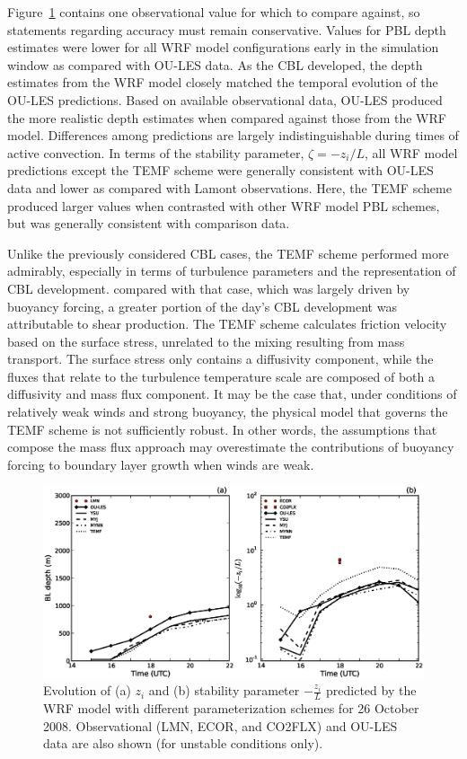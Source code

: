 Figure~\ref{figure425} contains one observational value for which to compare against, so statements regarding accuracy must remain conservative. Values for PBL depth estimates were lower for all WRF model configurations early in the simulation window as compared with OU-LES data. As the CBL developed, the depth estimates from the WRF model closely matched the temporal evolution of the OU-LES predictions. Based on available observational data, OU-LES produced the more realistic depth estimates when compared against those from the WRF model. Differences among predictions are largely indistinguishable during times of active convection. In terms of the stability parameter, $\zeta = -z_i / L$, all WRF model predictions except the TEMF scheme were generally consistent with OU-LES data and lower as compared with Lamont observations. Here, the TEMF scheme produced larger values when contrasted with other WRF model PBL schemes, but was generally consistent with comparison data.

Unlike the previously considered CBL cases, the TEMF scheme performed more admirably, especially in terms of turbulence parameters and the representation of CBL development. compared with that case, which was largely driven by buoyancy forcing, a greater portion of the day's CBL development was attributable to shear production. The TEMF scheme calculates friction velocity based on the surface stress, unrelated to the mixing resulting from mass transport. The surface stress only contains a diffusivity component, while the fluxes that relate to the turbulence temperature scale are composed of both a diffusivity and mass flux component. It may be the case that, under conditions of relatively weak winds and strong buoyancy, the physical model that governs the TEMF scheme is not sufficiently robust. In other words, the assumptions that compose the mass flux approach may overestimate the contributions of buoyancy forcing to boundary layer growth when winds are weak.


\begin{figure}[ht!]
\begin{center}
\includegraphics[width=\textwidth]{figures/chapter4/pblh_phi_phys_20081026}
\end{center}
\caption{Evolution of (a) $z_i$ and (b) stability parameter $-\frac{z_i}{L}$ predicted by the WRF model with different parameterization schemes for 26 October 2008. Observational (LMN, ECOR, and CO2FLX) and OU-LES data are also shown (for unstable conditions only).}
\label{figure425}
\end{figure}


